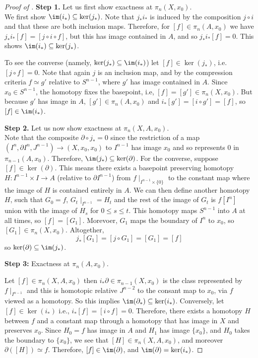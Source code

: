 \documentclass[ma3408.tex]{subfiles}
\begin{document}
\begin{proof}[Proof of ]
	\textbf{Step 1. }Let us first show exactness at $\pi_n(X,x_0)$. \\

	We first show $\im(i_*) \subseteq \ker(j_*)$. Note that $j_*i_*$ is induced by the composition $j \circ i$ and that these are both inclusion maps. Therefore, for $[f] \in \pi_n(A,x_0)$ we have $j_*i_*[f] = [j \circ i \circ f]$, but this has image contained in $A$, and so $j_*i_*[f] = 0$. This shows $\im(i_*) \subseteq \ker(j_*)$. 

	To see the converse (namely, $\ker(j_*) \subseteq \im(i_*)$) let $[f] \in \ker(j_*)$, i.e. $[j \circ f] = 0$. Note that again $j$ is an inclusion map, and by the compression criteria $f \simeq g'$ relative to $S^{n-1}$, where $g'$ has image contained in $A$. Since $x_0 \in S^{n-1}$, the homotopy fixes the basepoint, i.e, $[f] = [g'] \in \pi_n(X,x_0)$. But because $g'$ has image in $A$, $[g'] \in \pi_n(A,x_0)$ and $i_*[g'] = [i \circ g'] = [f]$, so $[f] \in \im(i_*)$. 

	\textbf{Step 2. } Let us now show exactness at $\pi_n(X,A,x_0)$. \\

	Note that the composite $\partial \circ j_* = 0$ since the restriction of a map $(I^n,\partial I^n,J^{n-1}) \to (X,x_0,x_0)$ to $I^{n-1}$ has image $x_0$ and so represents $0$ in $\pi_{n-1}(A,x_0)$. Therefore, $\im(j_*) \subseteq \ker(\partial)$. For the converse, suppose $[f] \in \ker(\partial)$. This means there exists a basepoint preserving homotopy $H \colon I^{n-1} \times I \to A$ (relative to $\partial I^{n-1}$) from $f \mid_{I^{n-1} \times \{ 0 \}}$ to the constant map where the image of $H$ is contained entirely in $A$. We can then define another homotopy $H$, such that $G_0 = f$, $G_t \mid_{I^{n-1}} = H_t$ and the rest of the image of $G_t$ is $f[I^n]$ union with the image of $H_s$ for $0 \le s \le t$. This homotopy maps $S^{n-1}$ into $A$ at all times, so $[f] = [G_1]$. Morevoer, $G_1$ maps the boundary of $I^n$ to $x_0$, so $[G_1] \in \pi_n(X,x_0)$. Altogether, 
	\[
j_*[G_1] = [j \circ G_1] = [G_1] = [f]
	\]
	so $\ker(\partial) \subseteq \im(j_*)$. 


\textbf{Step 3:} Exactness at $\pi_n(A,x_0)$.
	
	Let $[f] \in \pi_n(X,A,x_0)$ then $i_*\partial \in \pi_{n-1}(X,x_0)$ is the class represented by $f \mid_{I^{n-1}}$ and this is homotopic relative $J^{n-2}$ to the consant map to $x_0$, via $f$ viewed as a homotopy. So this implies $\im(\partial_*) \subseteq \ker(i_*)$. Conversely, let $[f] \in \ker(i_*)$ i.e., $i_*[f]= [i \circ f]= 0$. Therefore, there exists a homotopy $H$ between $f$ and a constant map through a homotopy that has image in $X$ and preserves $x_0$. Since $H_0 = f$ has image in $A$ and $H_1$ has image $\{x_0\}$, and $H_0$ takes the boundary to $\{ x_0 \}$, we see that $[H] \in \pi_n(X,A,x_0)$, and moreover $\partial([H]) \simeq f$. Therefore, $[f] \in \im(\partial)$, and $\im(\partial) = \ker(i_*)$. 
\end{proof}
\end{document}
